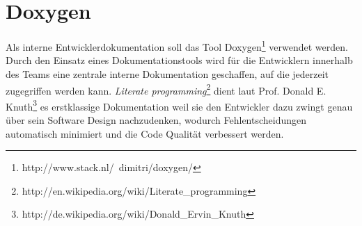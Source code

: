 \section{Doxygen}
Als interne Entwicklerdokumentation soll das Tool Doxygen\footnote{http://www.stack.nl/~dimitri/doxygen/} verwendet werden.
Durch den Einsatz eines Dokumentationstools wird für die Entwicklern innerhalb des Teams eine zentrale interne Dokumentation geschaffen,
auf die jederzeit zugegriffen werden kann. 
\emph{Literate programming}\footnote{http://en.wikipedia.org/wiki/Literate\_programming} dient laut Prof. Donald E. Knuth\footnote{http://de.wikipedia.org/wiki/Donald\_Ervin\_Knuth} 
es erstklassige Dokumentation weil sie den Entwickler dazu zwingt genau über sein Software Design nachzudenken, wodurch
Fehlentscheidungen automatisch minimiert und die Code Qualität verbessert werden.

